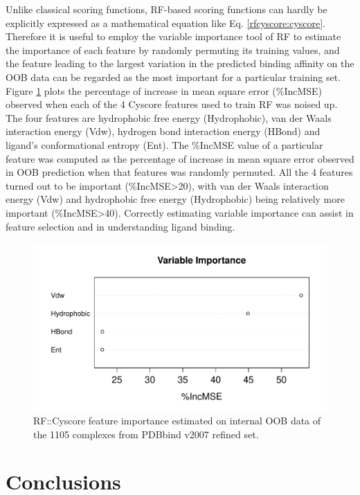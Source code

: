 Unlike classical scoring functions, RF-based scoring functions can hardly be explicitly expressed as a mathematical equation like Eq. \eqref{rfcyscore:cyscore}. Therefore it is useful to employ the variable importance tool of RF to estimate the importance of each feature by randomly permuting its training values, and the feature leading to the largest variation in the predicted binding affinity on the OOB data can be regarded as the most important for a particular training set. Figure \ref{rfcyscore:varimp} plots the percentage of increase in mean square error (\%IncMSE) observed when each of the 4 Cyscore features used to train RF was noised up. The four features are hydrophobic free energy (Hydrophobic), van der Waals interaction energy (Vdw), hydrogen bond interaction energy (HBond) and ligand's conformational entropy (Ent). The \%IncMSE value of a particular feature was computed as the percentage of increase in mean square error observed in OOB prediction when that features was randomly permuted. All the 4 features turned out to be important (\%IncMSE\textgreater 20), with van der Waals interaction energy (Vdw) and hydrophobic free energy (Hydrophobic) being relatively more important (\%IncMSE\textgreater 40). Correctly estimating variable importance can assist in feature selection and in understanding ligand binding.

\begin{figure}
\includegraphics[width=\linewidth]{../rfcyscore/varimp.pdf}
\caption{RF::Cyscore feature importance estimated on internal OOB data of the 1105 complexes from PDBbind v2007 refined set.}
\label{rfcyscore:varimp}
\end{figure}

\section{Conclusions}

